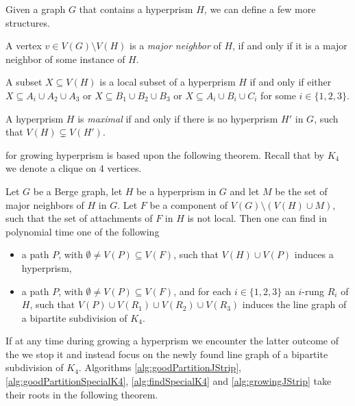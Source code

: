 Given a graph $G$ that contains a hyperprism $H$, we can define a few more structures.

\begin{defnTwo}
  A vertex $v \in V(G) \setminus V(H)$ is a \emph{major neighbor} of $H$, if and only if it is a major neighbor of some instance of $H$.
\end{defnTwo}

\begin{defnTwo}
  A subset $X \subseteq V(H)$ is a local subset of a hyperprism $H$ if and only if either $X \subseteq A_i \cup A_2 \cup A_3$ or $X \subseteq B_1 \cup B_2 \cup B_3$ or $X \subseteq A_i \cup B_i \cup C_i$ for some $i \in \{1, 2, 3\}$.
\end{defnTwo}

\begin{defnTwo}
  A hyperprism $H$ is \emph{maximal} if and only if there is no hyperprism $H'$ in $G$, such that $V(H) \varsubsetneq V(H')$.
\end{defnTwo}




 for growing hyperprism is based upon the following theorem. Recall that by $K_4$ we denote a clique on 4 vertices.
\begin{theorem}
  Let $G$ be a Berge graph, let $H$ be a hyperprism in $G$ and let $M$ be the set of major neighbors of $H$ in $G$. Let $F$ be a component of $V(G) \setminus(V(H) \cup M)$, such that the set of attachments of $F$ in $H$ is not local. Then one can find in polynomial time one of the following
  \begin{itemize}
    \item a path $P$, with $\emptyset \neq V(P) \subseteq V(F)$, such that $V(H) \cup V(P)$ induces a hyperprism,
    \item a path $P$, with $\emptyset \neq V(P) \subseteq V(F)$, and for each $i \in \{1, 2, 3\}$ an $i$-rung $R_i$ of $H$, such that $V(P) \cup V(R_1) \cup V(R_2) \cup V(R_3)$ induces the line graph of a bipartite subdivision of $K_4$.
  \end{itemize}
  \label{thm:growingHyperprism}
\end{theorem}

If at any time during growing a hyperprism we encounter the latter outcome of the  we stop it and instead focus on the newly found line graph of a bipartite subdivision of $K_4$. Algorithms \ref{alg:goodPartitionJStrip}, \ref{alg:goodPartitionSpecialK4}, \ref{alg:findSpecialK4} and \ref{alg:growingJStrip} take their roots in the following theorem.


